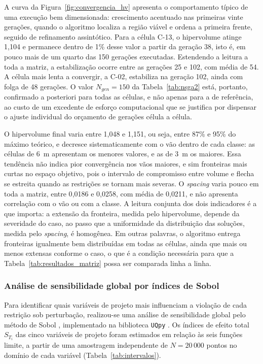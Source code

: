 A curva da Figura~\ref{fig:convergencia_hv} apresenta o comportamento típico de uma execução bem dimensionada: crescimento acentuado nas primeiras vinte gerações, quando o algoritmo localiza a região viável e ordena a primeira frente, seguido de refinamento assintótico.
Para a célula C-13, o hipervolume atinge 1{,}104 e permanece dentro de 1\% desse valor a partir da geração 38, isto é, em pouco mais de um quarto das 150 gerações executadas.
Estendendo a leitura a toda a matriz, a estabilização ocorre entre as gerações 25 e 102, com média de 54.
A célula mais lenta a convergir, a C-02, estabiliza na geração 102, ainda com folga de 48 gerações.
O valor $N_{gen} = 150$ da Tabela~\ref{tab:nsga2} está, portanto, confirmado a posteriori para todas as células, e não apenas para a de referência, ao custo de um excedente de esforço computacional que se justifica por dispensar o ajuste individual do orçamento de gerações célula a célula.

O hipervolume final varia entre 1{,}048 e 1{,}151, ou seja, entre 87\% e 95\% do máximo teórico, e decresce sistematicamente com o vão dentro de cada classe: as células de 6~m apresentam os menores valores, e as de 3~m os maiores.
Essa tendência não indica pior convergência nos vãos maiores, e sim fronteiras mais curtas no espaço objetivo, pois o intervalo de compromisso entre volume e flecha se estreita quando as restrições se tornam mais severas.
O \textit{spacing} varia pouco em toda a matriz, entre 0{,}0186 e 0{,}0258, com média de 0{,}0211, e não apresenta correlação com o vão ou com a classe.
A leitura conjunta dos dois indicadores é a que importa: a extensão da fronteira, medida pelo hipervolume, depende da severidade do caso, ao passo que a uniformidade da distribuição das soluções, medida pelo \textit{spacing}, é homogênea.
Em outras palavras, o algoritmo entrega fronteiras igualmente bem distribuídas em todas as células, ainda que mais ou menos extensas conforme o caso, o que é a condição necessária para que a Tabela~\ref{tab:resultados_matriz} possa ser comparada linha a linha.

\subsubsection{Análise de sensibilidade global por índices de Sobol}\label{sec:sobol}

Para identificar quais variáveis de projeto mais influenciam a violação de cada restrição sob perturbação, realizou-se uma análise de sensibilidade global pelo método de Sobol \parencite{Sobol2001}, implementado na biblioteca \texttt{UQpy} \parencite{Olivier2020}.
Os índices de efeito total $S_{T_i}$ das cinco variáveis de projeto foram estimados em relação às seis funções limite, a partir de uma amostragem independente de $N = 20\,000$ pontos no domínio de cada variável (Tabela~\ref{tab:intervalos}).

